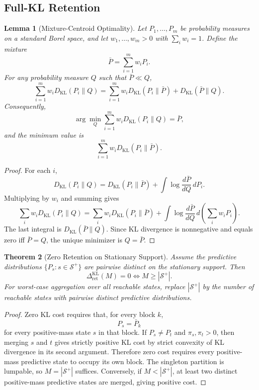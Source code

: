 \documentclass[12pt]{article}
\newtheorem{theorem}{Theorem}[section]
\newtheorem{lemma}[theorem]{Lemma}
\theoremstyle{definition}
\newcommand{\RetKL}{\Delta_{\mathrm{ret}}^{\mathrm{KL}}}
\newcommand{\Splus}{\mathcal S^{+}}
\begin{document}
\subsection{Full-KL Retention}
\label{subsec:full-kl-retention}

\begin{lemma}[Mixture-Centroid Optimality]
\label{lem:mixture-centroid}
Let $P_1,\dots,P_m$ be probability measures on a standard Borel space, and let
$w_1,\dots,w_m>0$ with $\sum_i w_i=1$.  Define the mixture
\[
\bar P=\sum_{i=1}^m w_i P_i.
\]
For any probability measure $Q$ such that $\bar P\ll Q$,
\[
\sum_{i=1}^m w_i D_{\mathrm{KL}}(P_i\|Q)
=
\sum_{i=1}^m w_i D_{\mathrm{KL}}(P_i\|\bar P)
+
D_{\mathrm{KL}}(\bar P\|Q).
\]
Consequently,
\[
\arg\min_Q
\sum_{i=1}^m w_i D_{\mathrm{KL}}(P_i\|Q)
=
\bar P,
\]
and the minimum value is
\[
\sum_{i=1}^m w_i D_{\mathrm{KL}}(P_i\|\bar P).
\]
\end{lemma}

\begin{proof}
For each $i$,
\[
D_{\mathrm{KL}}(P_i\|Q)
=
D_{\mathrm{KL}}(P_i\|\bar P)
+
\int
\log\frac{d\bar P}{dQ}\,dP_i.
\]
Multiplying by $w_i$ and summing gives
\[
\sum_i w_i D_{\mathrm{KL}}(P_i\|Q)
=
\sum_i w_i D_{\mathrm{KL}}(P_i\|\bar P)
+
\int
\log\frac{d\bar P}{dQ}
\,d\!\left(\sum_i w_i P_i\right).
\]
The last integral is $D_{\mathrm{KL}}(\bar P\|Q)$.  Since KL divergence is
nonnegative and equals zero iff $\bar P=Q$, the unique minimizer is
$Q=\bar P$.
\end{proof}

\begin{theorem}[Zero Retention on Stationary Support]
\label{thm:retention-zero}
Assume the predictive distributions $\{P_s:s\in\Splus\}$ are pairwise distinct
on the stationary support.  Then
\[
\RetKL(M)=0
\iff
M\ge |\Splus|.
\]
For worst-case aggregation over all reachable states, replace $|\Splus|$ by
the number of reachable states with pairwise distinct predictive
distributions.
\end{theorem}

\begin{proof}
Zero KL cost requires that, for every block $k$,
\[
P_s=\bar P_k
\]
for every positive-mass state $s$ in that block.  If $P_s\neq P_t$ and
$\pi_s,\pi_t>0$, then merging $s$ and $t$ gives strictly positive KL cost by
strict convexity of KL divergence in its second argument.
Therefore zero cost requires every positive-mass predictive state to occupy
its own block.  The singleton partition is lumpable, so $M=|\Splus|$
suffices.  Conversely, if $M<|\Splus|$, at least two distinct positive-mass
predictive states are merged, giving positive cost.
\end{proof}
\end{document}
